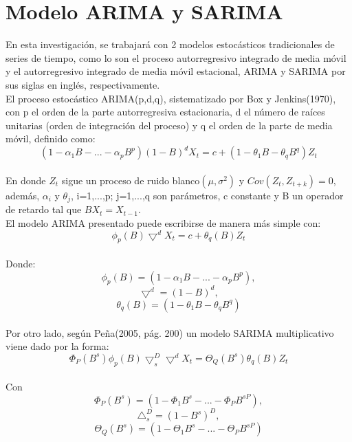 \documentclass{report}
\begin{document}
\newpage
\section{Modelo ARIMA y SARIMA}
En esta investigación, se trabajará con 2 modelos estocásticos tradicionales de series de tiempo, como lo son el proceso autorregresivo integrado de media móvil y el autorregresivo integrado de media móvil estacional, ARIMA y SARIMA por sus siglas en inglés, respectivamente.\\

El proceso estocástico ARIMA(p,d,q), sistematizado por Box y Jenkins(1970), con p el orden de la parte autorregresiva estacionaria, d el número de raíces unitarias (orden de integración del proceso) y q el orden de la parte de media móvil, definido como:
    \begin{equation}
        (1-\alpha_{1}B-...-\alpha_{p}B^{p})(1-B)^{d}X_{t}=c+(1-\theta_{1}B-\theta_{q}B^{q})Z_{t}
    \end{equation}\\
    
En donde $Z_{t}$ sigue un proceso de ruido blanco$(\mu,\sigma^{2})$ y $Cov(Z_{t},Z_{t+k})=0$, además, $\alpha_{i}$ y $\theta_{j}$, i=1,...,p; j=1,...,q son parámetros, c constante y B un operador de retardo tal que $BX_{t}=X_{t-1}$.\\

El modelo ARIMA presentado puede escribirse de manera más simple con:\\
    \begin{equation}
        \phi_{p}(B)\bigtriangledown^{d}X_{t}=c+\theta_{q}(B)Z_{t}
    \end{equation}\\
    \vspace{1cm}
    Donde: $$\phi_{p}(B)=(1-\alpha_{1}B-...-\alpha_{p}B^{p}),$$
    $$\bigtriangledown^{d}=(1-B)^{d},$$
    $$\theta_{q}(B)=(1-\theta_{1}B-\theta_{q}B^{q})$$\\
    
    Por otro lado, según Peña(2005, pág. 200) un modelo SARIMA multiplicativo viene dado por la forma:\\
    \begin{equation}
        \Phi_{P}(B^{s})\phi_{p}(B)\bigtriangledown_{s}^{D}\bigtriangledown^{d}X_{t}=\Theta_{Q}(B^{s})\theta_{q}(B)Z_{t}
    \end{equation}\\ \pause
    \vspace{1cm}
    Con $$\Phi_{P}(B^{s})=(1-\Phi_{1}B^{s}-...-\Phi_{P}B^{sP}),$$ $$\triangle_{s}^{D}=(1-B^{s})^{D},$$ $$\Theta_{Q}(B^{s})=(1-\Theta_{1}B^{s}-...-\Theta_{P}B^{sP})$$\\
    
\end{document}
